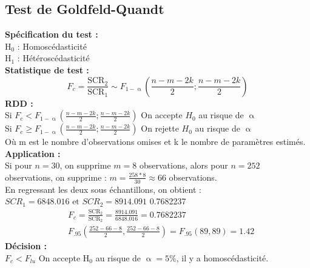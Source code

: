 \documentclass[A4paper]{article}
\begin{document}
\subsection{Test de Goldfeld-Quandt}
\textbf{Spécification du test :} \\
H$_0$ : Homoscédasticité \\
H$_1$ : Hétéroscédasticité \\
\textbf{Statistique de test :}
\begin{equation*}
	F_c = \frac{\text{SCR}_2}{\text{SCR}_1} \sim F_{1-\upalpha} \left( \frac{n-m-2k}{2} ; \frac{n-m-2k}{2} \right) 
\end{equation*}
\textbf{RDD :} \\
Si $ F_c < F_{1-\upalpha}\left( \frac{n-m-2k}{2} ; \frac{n-m-2k}{2} \right) $ On accepte $H_0$ au risque de $\upalpha$\\
Si $ F_c \geq F_{1-\upalpha}\left( \frac{n-m-2k}{2} ; \frac{n-m-2k}{2} \right) $ On rejette $H_0$ au risque de $\upalpha$ \\
Où m est le nombre d'observations omises et k le nombre de paramètres estimés. \\
\textbf{Application : }\\
Si pour $n=30$, on supprime $m=8$ observations, alors pour $n=252$ observations, on supprime : $m = \frac{258*8}{30} \approx 66$ observations.\\
En regressant les deux sous échantillons, on obtient : \\
$SCR_1 = 6848.016 \text{ et } SCR_2 = 8914.091$  0.7682237 
\begin{equation*}
\begin{split}
	&F_c = \frac{\text{SCR}_2}{\text{SCR}_2} = \frac{8914.091}{6848.016} = 0.7682237 \\ 
	&F_{.95}(\frac{252-66-8}{2},\frac{252-66-8}{2}) = F_{.95}(89,89) = 1.42 
\end{split}
\end{equation*}
\textbf{Décision : }\\
$F_c < F_{lu} $ On accepte H$_0$ au risque de $\upalpha = 5\%$, il y a homoscédasticité.
\newpage
\end{document}
